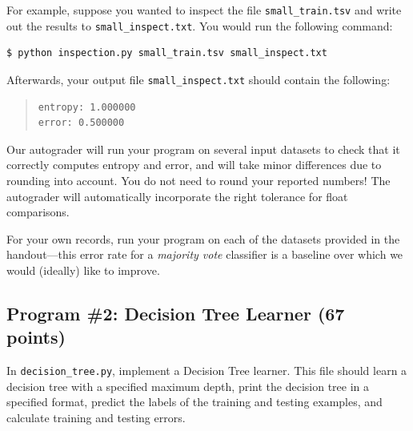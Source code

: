 \documentclass[11pt,addpoints,answers]{exam}
\begin{document}
For example, suppose you wanted to inspect the file \lstinline{small_train.tsv} and write out the results to \lstinline{small_inspect.txt}. You would run the following command:
%
\begin{lstlisting}[language=Shell]
$ python inspection.py small_train.tsv small_inspect.txt
\end{lstlisting}
%
Afterwards, your output file \lstinline{small_inspect.txt} should contain the following:
%
\begin{quote}
\begin{verbatim}
entropy: 1.000000
error: 0.500000
\end{verbatim}
\end{quote}
%
Our autograder will run your program on several input datasets to check that it correctly computes entropy and error, and will take minor differences due to rounding into account. You do not need to round your reported numbers! The autograder will automatically incorporate the right tolerance for float comparisons.

\begin{notebox}
For your own records, run your program on each of the datasets provided in the handout---this error rate for a \emph{majority vote} classifier is a baseline over which we would (ideally) like to improve.
\end{notebox}

\subsection{Program \#2: Decision Tree Learner (67 points)}
\label{sec:decisiontree}

In \texttt{decision\_tree.py}, implement a Decision Tree learner. This file should learn a decision tree with a specified maximum depth, print the decision tree in a specified format, predict the labels of the training and testing examples, and calculate training and testing errors.
\end{document}
